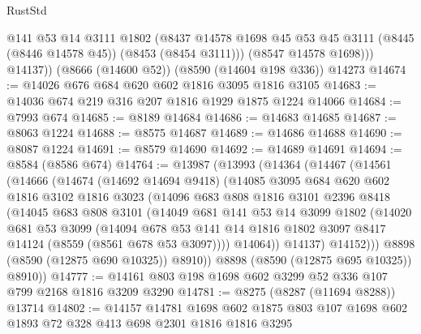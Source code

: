 \begin{lexlean}{RustStd}
\begin{coremodule}
            @141
            @53
            @14
            @3111
            @1802
            (@8437 @14578 @1698 @45 @53 @45 @3111 (@8445 (@8446 @14578 @45)) (@8453 (@8454 @3111)))
            (@8547 @14578 @1698)))
        @14137))
    (@8666 (@14600 @52))
    (@8590 (@14604 @198 @336))
    @14273
@14674 := @14026 @676 @684 @620 @602 @1816 @3095 @1816 @3105
@14683 := @14036 @674 @219 @316 @207 @1816 @1929 @1875 @1224 @14066
@14684 := @7993 @674
@14685 := @8189 @14684
@14686 := @14683 @14685
@14687 := @8063 @1224
@14688 := @8575 @14687
@14689 := @14686 @14688
@14690 := @8087 @1224
@14691 := @8579 @14690
@14692 := @14689 @14691
@14694 := @8584 (@8586 @674)
@14764 := @13987
    (@13993
      (@14364
        (@14467
          (@14561
            (@14666
              (@14674
                (@14692 @14694 @9418)
                (@14085
                  @3095
                  @684
                  @620
                  @602
                  @1816
                  @3102
                  @1816
                  @3023
                  (@14096
                    @683
                    @808
                    @1816
                    @3101
                    @2396
                    @8418
                    (@14045
                      @683
                      @808
                      @3101
                      (@14049
                        @681
                        @141
                        @53
                        @14
                        @3099
                        @1802
                        (@14020
                          @681
                          @53
                          @3099
                          (@14094
                            @678
                            @53
                            @141
                            @14
                            @1816
                            @1802
                            @3097
                            @8417
                            @14124
                            (@8559 (@8561 @678 @53 @3097))))
                        @14064))
                    @14137)
                  @14152)))
            @8898
            (@8590 (@12875 @690 @10325))
            @8910))
        @8898
        (@8590 (@12875 @695 @10325))
        @8910))
@14777 := @14161 @803 @198 @1698 @602 @3299 @52 @336 @107 @799 @2168 @1816 @3209 @3290
@14781 := @8275 (@8287 (@11694 @8288)) @13714
@14802 := @14157
    @14781
    @1698
    @602
    @1875
    @803
    @107
    @1698
    @602
    @1893
    @72
    @328
    @413
    @698
    @2301
    @1816
    @1816
    @3295

\end{coremodule}
\end{lexlean}
